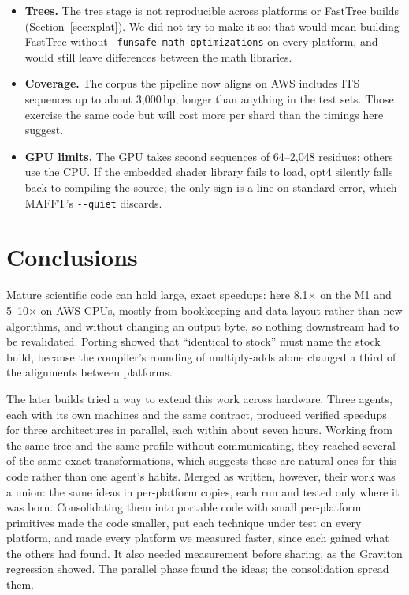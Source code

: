 \documentclass[11pt]{article}
\newcommand{\code}[1]{\texttt{#1}}
\begin{document}
\begin{itemize}
  (Section~\ref{sec:provenance}).
\item \textbf{Trees.} The tree stage is not reproducible across platforms or FastTree builds
  (Section~\ref{sec:xplat}). We did not try to make it so: that would mean building FastTree
  without \code{-funsafe-math-\allowbreak optimizations} on every platform, and would still leave
  differences between the math libraries.
\item \textbf{Coverage.} The corpus the pipeline now aligns on AWS includes ITS sequences up to about
  3{,}000\,bp, longer than anything in the test sets. Those exercise the same code but will cost
  more per shard than the timings here suggest.
\item \textbf{GPU limits.} The GPU takes second sequences of 64--2{,}048 residues; others use
  the CPU. If the embedded shader library fails to load, opt4 silently falls back to
  compiling the source; the only sign is a line on standard error, which MAFFT's
  \code{-{}-quiet} discards.
\end{itemize}

\section{Conclusions}

Mature scientific code can hold large, exact speedups: here 8.1$\times$ on the M1 and
5--10$\times$ on AWS CPUs, mostly from bookkeeping and data layout rather than new algorithms,
and without changing an output byte, so nothing downstream had to be revalidated. Porting
showed that ``identical to stock'' must name the stock build, because the compiler's rounding
of multiply-adds alone changed a third of the alignments between platforms.

The later builds tried a way to extend this work across hardware. Three agents, each with its
own machines and the same contract, produced verified speedups for three architectures in
parallel, each within about seven hours. Working from the same tree and the same profile without
communicating, they reached several of the same exact transformations, which suggests these are
natural ones for this code rather than one agent's habits. Merged as written, however, their work
was a union: the same ideas in per-platform copies, each run and tested only where it was born.
Consolidating them into portable code with small per-platform primitives made the code smaller,
put each technique under test on every platform, and made every platform we measured faster,
since each gained what the others had found. It also needed measurement before sharing, as the Graviton
regression showed. The parallel phase found the ideas; the consolidation spread them.
\end{document}
